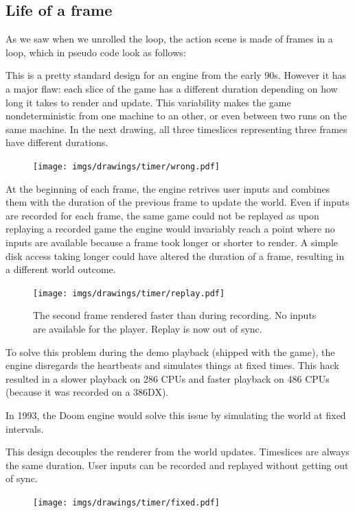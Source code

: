 \subsection{Life of a frame}
As we saw when we unrolled the loop, the action scene is made of frames in a loop, which in pseudo code look as follows:\\
\par
\begin{minipage}{\textwidth}
 
 \end{minipage}
\par
This is a pretty standard design for an engine from the early 90s. However it has a major flaw: each slice of the game has a different duration depending on how long it takes to render and update. This variability makes the game nondeterministic from one machine to an other, or even between two runs on the same machine. In the next drawing, all three timeslices representing three frames have different durations.\\
\begin{figure}[H]
\centering
 \texttt{[image: imgs/drawings/timer/wrong.pdf]}
 
 \end{figure}
  At the beginning of each frame, the engine retrives user inputs and combines them with the duration of the previous frame to update the world. Even if inputs are recorded for each frame, the same game could not be replayed as upon replaying a recorded game the engine would invariably reach a point where no inputs are available because a frame took longer or shorter to render. A simple disk access taking longer could have altered the duration of a frame, resulting in a different world outcome.\\
 \begin{figure}[H]
\centering
 \texttt{[image: imgs/drawings/timer/replay.pdf]}
 \caption{The second frame rendered faster than during recording. No inputs are available for the player. Replay is now out of sync.}
 \end{figure}
\par
To solve this problem during the demo playback (shipped with the game), the engine disregards the heartbeats and simulates things at fixed times. This hack resulted in a slower playback on 286 CPUs and faster playback on 486 CPUs (because it was recorded on a 386DX).\\
\par
In 1993, the Doom engine would solve this issue by simulating the world at fixed intervals.\\
\par
\begin{minipage}{\textwidth}
 
 \end{minipage}
\par
This design decouples the renderer from the world updates. Timeslices are always the same duration. User inputs can be recorded and replayed without getting out of sync.
\par
 \begin{figure}[H]
\centering
 \texttt{[image: imgs/drawings/timer/fixed.pdf]}
 \end{figure}

